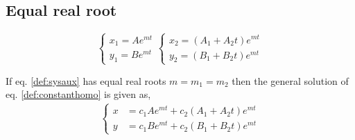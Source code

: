 \documentclass[oneside,11pt,pdftex,final]{book}%
\numberwithin{equation}{section}
\newtheorem{example}[theorem]{Example}
\numberwithin{section}{chapter}
\numberwithin{equation}{chapter}
\begin{document}
%
%

\subsection{Equal real root}
\[ \begin{cases}
	x_1=Ae^{mt}\\
	y_1=Be^{mt}
\end{cases} \begin{cases}
x_2=(A_1+A_2t)e^{mt}\\
y_2=(B_1+B_2t)e^{mt}
\end{cases}\]

If eq. \ref{def:sysaux} has equal real roots $m= m_1=m_2 $ then the general solution of eq. \ref{def:constanthomo} is given as,
\begin{align*}
	\begin{cases}
		x&=c_1Ae^{mt}+c_2(A_1+A_2t)e^{mt}\\
		y&=c_1Be^{mt}+c_2(B_1+B_2t)e^{mt}
	\end{cases}
\end{align*}
\end{document}
